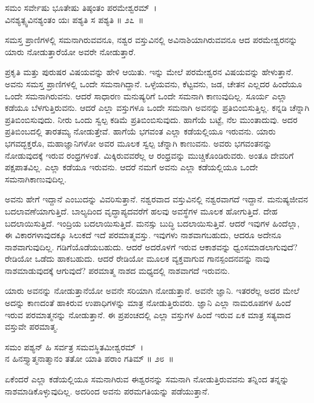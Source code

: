 \begin{shloka}
ಸಮಂ ಸರ್ವೇಷು ಭೂತೇಷು ತಿಷ್ಠಂತಂ ಪರಮೇಶ್ವರಮ್~।\\ವಿನಶ್ಯತ್ಸ್ವವಿನಶ್ಯಂತಂ ಯಃ ಪಶ್ಯತಿ ಸ ಪಶ್ಯತಿ \hfill॥ ೨೭~॥
\end{shloka}

\begin{artha}
ಸಮಸ್ತ ಪ್ರಾಣಿಗಳಲ್ಲಿ ಸಮನಾಗಿರುವವನೂ, ನಶ್ವರ ವಸ್ತುವಿನಲ್ಲಿ ಅವಿನಾಶಿಯಾಗಿರುವವನೂ ಆದ ಪರಮೇಶ್ವರನನ್ನು ಯಾರು ನೋಡುತ್ತಾರೆಯೋ ಅವರೇ ನೋಡುತ್ತಾರೆ.
\end{artha}

ಪ್ರಕೃತಿ ಮತ್ತು ಪುರುಷರ ವಿಷಯವನ್ನು ಹೇಳಿ ಆಯಿತು. ಇನ್ನು ಮೇಲೆ ಪರಮೇಶ್ವರನ ವಿಷಯವನ್ನು ಹೇಳುತ್ತಾನೆ. ಅವನು ಸಮಸ್ತ ಪ್ರಾಣಿಗಳಲ್ಲಿ ಒಂದೇ ಸಮನಾಗಿದ್ದಾನೆ. ಒಳ್ಳೆಯವನು, ಕೆಟ್ಟವನು, ಜಡ, ಚೇತನ ಎಲ್ಲದರ ಹಿಂದೆಯೂ ಒಂದೇ ಸಮನಾಗಿರುವನು. ಆದರೆ ಸಾಧಾರಣ ಮನುಷ್ಯರಿಗೆ ಒಂದೇ ಸಮನಾಗಿ ಕಾಣುವುದಿಲ್ಲ. ಸೂರ್ಯ ಎಲ್ಲಾ ಕಡೆಯೂ ಬೆಳಗುತ್ತಿರುವನು. ಆದರೆ ಎಲ್ಲಾ ವಸ್ತುಗಳೂ ಒಂದೇ ಸಮನಾಗಿ ಅವನನ್ನು ಪ್ರತಿಬಿಂಬಿಸುತ್ತಿಲ್ಲ. ಕನ್ನಡಿ ಚೆನ್ನಾಗಿ ಪ್ರತಿಬಿಂಬಿಸುವುದು. ನೀರು ಒಂದು ಸ್ವಲ್ಪ ಕಡಿಮೆ ಪ್ರತಿಬಿಂಬಿಸುವುದು. ಹಾಗೆಯೆ ಬಟ್ಟೆ, ನೆಲ ಮುಂತಾದುವು. ಅದರ ಪ್ರತಿಬಿಂಬದಲ್ಲಿ ತಾರತಮ್ಯ ನೋಡುತ್ತೇವೆ. ಹಾಗೆಯೆ ಭಗವಂತ ಎಲ್ಲಾ ಕಡೆಯಲ್ಲಿಯೂ ಇರುವನು. ಯಾರು ಭಗವದ್ಭಕ್ತರೊ, ಮಹಾಜ್ಞಾನಿಗಳೋ ಅವರ ಮೂಲಕ ಸ್ವಲ್ಪ ಚೆನ್ನಾಗಿ ಕಾಣುವನು. ಅವರು ಭಗವಂತನನ್ನು ನೋಡುವುದಕ್ಕೆ ಇರುವ ರಂಧ್ರಗಳಂತೆ. ಮಿಕ್ಕಿರುವವರೆಲ್ಲ ಆ ರಂಧ್ರವನ್ನು ಮುಚ್ಚಿಕೊಂಡಿರುವರು. ಅಂತೂ ದೇವರಿಗೆ ಪಕ್ಷಪಾತವಿಲ್ಲ. ಎಲ್ಲಾ ಕಡೆಯೂ ಇರುವನು. ಆದರೆ ನಮಗೆ ಅವನು ಎಲ್ಲಾ ಕಡೆಯಲ್ಲಿಯೂ ಒಂದೇ ಸಮನಾಗಿ\break ಕಾಣುವುದಿಲ್ಲ.

ಅವನು ಹೇಗೆ ಇದ್ದಾನೆ ಎಂಬುದನ್ನು ವಿವರಿಸುತ್ತಾನೆ. ನಶ್ವರವಾದ ವಸ್ತುವಿನಲ್ಲಿ ನಶ್ವರವಾಗದೆ ಇದ್ದಾನೆ. ಮನುಷ್ಯಜೀವನ ಬದಲಾವಣೆಯಾಗುತ್ತಿದೆ. ಬಾಲ್ಯದಿಂದ ವೃದ್ಧಾಪ್ಯದವರೆಗೆ ಹಲವು ಅವಸ್ಥೆಗಳ ಮೂಲಕ ಹೋಗುತ್ತಿದೆ. ದೇಹ ಬದಲಾಯಿಸುತ್ತಿದೆ. ಇಂದ್ರಿಯ ಬದಲಾಯಿಸುತ್ತಿದೆ. ಮನಸ್ಸು ಬುದ್ಧಿ ಬದಲಾಯಿಸುತ್ತಿವೆ. ಆದರೆ ಇವುಗಳ ಹಿಂದೆಲ್ಲಾ, ಈ ವಿಕಾರಗಳಾವುದಕ್ಕೂ ಸಿಲುಕದೆ ಇದೆ ಪರಮಾತ್ಮವಸ್ತು. ಇವುಗಳು ನಾಶವಾಗಬಹುದು, ಆದರೂ ಅದೇನೂ ನಾಶವಾಗುವುದಿಲ್ಲ. ಗಡಿಗೆಯೊಡೆಯಬಹುದು. ಆದರೆ ಅದರೊಳಗೆ ಇರುವ ಆಕಾಶವನ್ನು ಧ್ವಂಸಮಾಡ\-ಲಾಗುವುದೆ? ರೇಡಿಯೋ ಒಡೆದು ಹಾಕಬಹುದು. ಆದರೆ ರೇಡಿಯೋ ಮೂಲಕ ವ್ಯಕ್ತವಾಗುವ ಗಾನಸ್ಪಂದನವನ್ನು ನಾವು ನಾಶಮಾಡುವುದಕ್ಕೆ ಆಗುವುದೆ? ಪರಮಾತ್ಮ ನಾಶದ ಮಧ್ಯದಲ್ಲಿ ನಾಶವಾಗದೆ ಇರುವನು.

ಯಾರು ಅವನನ್ನು ನೋಡುತ್ತಾನೆಯೋ ಅವನೇ ಸರಿಯಾಗಿ ನೋಡುತ್ತಾನೆ. ಅವನೇ ಜ್ಞಾನಿ. ಇತರರೆಲ್ಲ ಅದರ ಮೇಲೆ ಅದನ್ನು ಕಾಣದಂತೆ ಹಾಕಿರುವ ಉಪಾಧಿಗಳನ್ನು ಮಾತ್ರ ನೋಡುತ್ತಿರುವರು. ಜ್ಞಾನಿ ಎಲ್ಲಾ ನಾಮರೂಪಗಳ ಹಿಂದೆ ಇರುವ ಪರಮಾತ್ಮನನ್ನು ನೋಡುತ್ತಾನೆ. ಈ ಪ್ರಪಂಚದಲ್ಲಿ ಎಲ್ಲಾ ವಸ್ತುಗಳ ಹಿಂದೆ ಇರುವ ಏಕ ಮಾತ್ರ ಸತ್ಯವಾದ ವಸ್ತುವೇ ಪರಮಾತ್ಮ.

\begin{shloka}
ಸಮಂ ಪಶ್ಯನ್ ಹಿ ಸರ್ವತ್ರ ಸಮವಸ್ಥಿತಮೀಶ್ವರಮ್~।\\ನ ಹಿನಸ್ತ್ಯಾತ್ಮನಾತ್ಮಾನಂ ತತೋ ಯಾತಿ ಪರಾಂ ಗತಿಮ್ \hfill॥ ೨೮~॥
\end{shloka}

\begin{artha}
ಏಕೆಂದರೆ ಎಲ್ಲಾ ಕಡೆಯಲ್ಲಿಯೂ ಸಮನಾಗಿರುವ ಈಶ್ವರನನ್ನು ಸಮನಾಗಿ ನೋಡುತ್ತಿರುವವನು ತನ್ನಿಂದ ತನ್ನನ್ನು ನಾಶಮಾಡಿಕೊಳ್ಳುವುದಿಲ್ಲ. ಅದರಿಂದ ಅವನು ಪರಮಗತಿಯನ್ನು ಪಡೆಯುತ್ತಾನೆ.
\end{artha}

